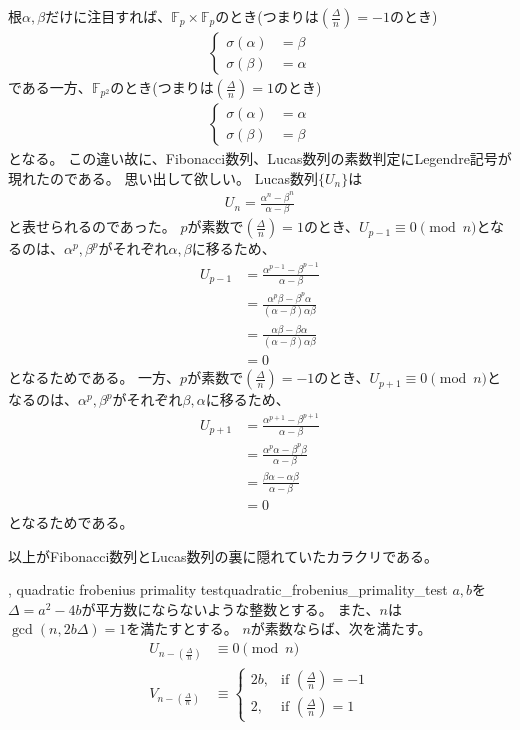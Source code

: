 根$\alpha,\beta$だけに注目すれば、$\mathbb{F}_p\times\mathbb{F}_p$のとき(つまりは$\left(\frac{\Delta}{n}\right)=-1$のとき)
\begin{align*}
\begin{cases}
\sigma(\alpha) &= \beta\\
\sigma(\beta) &= \alpha
\end{cases}
\end{align*}
である一方、$\mathbb{F}_{p^2}$のとき(つまりは$\left(\frac{\Delta}{n}\right)=1$のとき)
\begin{align*}
\begin{cases}
\sigma(\alpha) &= \alpha\\
\sigma(\beta) &= \beta
\end{cases}
\end{align*}
となる。
この違い故に、Fibonacci数列、Lucas数列の素数判定にLegendre記号が現れたのである。
思い出して欲しい。
Lucas数列$\{U_n\}$は
\begin{align*}
U_n = \frac{\alpha^n - \beta^n}{\alpha - \beta}
\end{align*}
と表せられるのであった。
$p$が素数で$\left(\frac{\Delta}{n}\right)=1$のとき、$U_{p-1} \equiv 0 \pmod{n}$となるのは、$\alpha^p,\beta^p$がそれぞれ$\alpha,\beta$に移るため、
\begin{align*}
U_{p-1} &= \frac{\alpha^{p-1} - \beta^{p-1}}{\alpha - \beta}\\
&= \frac{\alpha^p\beta - \beta^p\alpha}{(\alpha-\beta)\alpha\beta}\\
&= \frac{\alpha\beta - \beta\alpha}{(\alpha-\beta)\alpha\beta}\\
&= 0
\end{align*}
となるためである。
一方、$p$が素数で$\left(\frac{\Delta}{n}\right)=-1$のとき、$U_{p+1} \equiv 0 \pmod{n}$となるのは、$\alpha^p,\beta^p$がそれぞれ$\beta,\alpha$に移るため、
\begin{align*}
U_{p+1} &= \frac{\alpha^{p+1} - \beta^{p+1}}{\alpha - \beta}\\
&= \frac{\alpha^p\alpha - \beta^p\beta}{\alpha-\beta}\\
&= \frac{\beta\alpha - \alpha\beta}{\alpha-\beta}\\
&= 0
\end{align*}
となるためである。

以上がFibonacci数列とLucas数列の裏に隠れていたカラクリである。

\begin{Theo}{, quadratic frobenius primality test}{quadratic_frobenius_primality_test}
$a,b$を$\Delta=a^2-4b$が平方数にならないような整数とする。
また、$n$は$\gcd(n,2b\Delta)=1$を満たすとする。
$n$が素数ならば、次を満たす。
\begin{align*}
U_{n - \left(\frac{\Delta}{n}\right)} &\equiv 0 \pmod{n}\\
V_{n - \left(\frac{\Delta}{n}\right)} &\equiv
\begin{cases}
2b, &\mbox{if } \left(\frac{\Delta}{n}\right) = -1\\
2,  &\mbox{if } \left(\frac{\Delta}{n}\right) = 1
\end{cases}
\end{align*}
\end{Theo}
